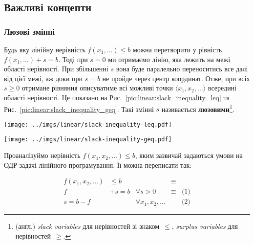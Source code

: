 \documentclass[\main/book.tex]{subfiles}
\begin{document}
\subsection{Важливі концепти}

\subsubsection{Люзові змінні}

Будь яку лінійну нерівність $f(x_1, \ldots) \leq b$ можна перетворити у рівність $f(x_1, \ldots) + s = b$. Тоді при ${s=0}$ ми отримаємо лінію, яка лежить на межі області нерівності. При збільшенні $s$ вона буде паралельно переноситись все далі від цієї межі, аж доки при $s=b$ не пройде через центр координат. Отже, при всіх $s \geq 0$ отримане рівняння описуватиме всі можливі точки $\langle x_1, x_2, \ldots \rangle$ всередині області нерівності. Це показано на Рис.~\ref{pic:linear:slack_inequality_leq} та Рис.~\ref{pic:linear:slack_inequality_geq}. Такі змінні $s$ називається \textbf{люзовими}\footnote{(англ.) \textit{slack variables} для нерівностей зі знаком~\flqq{}$\leq$\frqq{}, \textit{surplus variables} для нерівностей~\flqq{}$\geq$\frqq{}.}.

\begin{figure*}
 \centering
 \begin{minipage}[t]{.47\textwidth}
  \texttt{[image: ../imgs/linear/slack-inequality-leq.pdf]}
  \caption{Нерівність $x_1 + x_2 \leq 4$ утворює область, межу якої можна описати рівнянням $x_1 + x_2 + s = 4$ при $s=0$. При $s=b=4$ ця лі\-нія проходить через центр координат.}
  \label{pic:linear:slack_inequality_leq}
 \end{minipage}\qquad
 \begin{minipage}[t]{.47\textwidth}
  \texttt{[image: ../imgs/linear/slack-inequality-geq.pdf]}
  \caption{Для того, щоби отримати такий самий ефект для нерівностей \flqq{}$\geq$\frqq{}, змінну $s$ потрібно включити у рівняння прямої зі знаком~\flqq{}$-$\frqq{}.}
  \label{pic:linear:slack_inequality_geq}
 \end{minipage}
\end{figure*}

Проаналізуймо нерівність $f(x_1, x_2, \ldots) \leq b$, яким зазвичай задаються умови на ОДР задачі лінійного програмування. Її можна переписати так:
 
\[
 \begin{array}{lrlll}
  f(x_1, x_2, \ldots) &  \leq b &                         & \equiv &            \\
  f                   & + s = b & \forall s > 0           & \equiv & \text{(1)} \\
  s = b - f           &         & \forall x_1, x_2, \ldots &        & \text{(2)}
 \end{array}
\]
\end{document}
